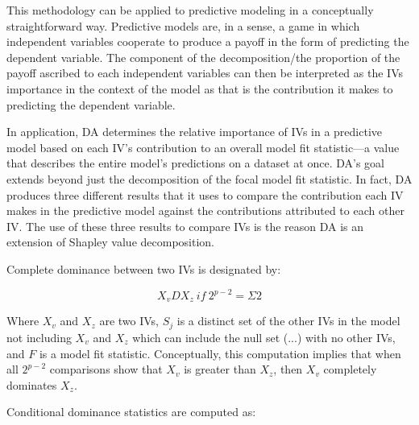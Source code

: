 \documentclass[ShortAfour,times,sageapa]{sagej}
\begin{document}
	
	This methodology can be applied to predictive modeling in a conceptually straightforward way.
	 Predictive models are, in a sense, a game in which independent variables cooperate to produce a payoff in the form of predicting the dependent variable. 
	The component of the decomposition/the proportion of the payoff ascribed to each independent variables can then be interpreted as the IVs importance in the context of the model as that is the contribution it makes to predicting the dependent variable.
	
	
	In application, DA determines the relative importance of IVs in a predictive model based on each IV’s contribution to an overall model fit statistic—a value that describes the entire model’s predictions on a dataset at once. 
	DA’s goal extends beyond just the decomposition of the focal model fit statistic. 
	In fact, DA produces three different results that it uses to compare the contribution each IV makes in the predictive model against the contributions attributed to each other IV. 
	The use of these three results to compare IVs is the reason DA is an extension of Shapley value decomposition.
	
	Complete dominance between two IVs is designated by:
	
	\begin{equation}
		X_{v}DX_{z}\ if\ 2^{p-2} = \Sigma{2} %
	\end{equation}
	
	Where $X_v$ and $X_z$ are two IVs, $S_j$ is a distinct set of the other IVs in the model not including $X_v$ and $X_z$ which can include the null set (...) with no other IVs, and $F$ is a model fit statistic. Conceptually, this computation implies that when all $2^{p-2}$ comparisons show that $X_v$ is greater than $X_z$, then $X_v$ completely dominates $X_z$.
	
	Conditional dominance statistics are computed as:
	
\end{document}
